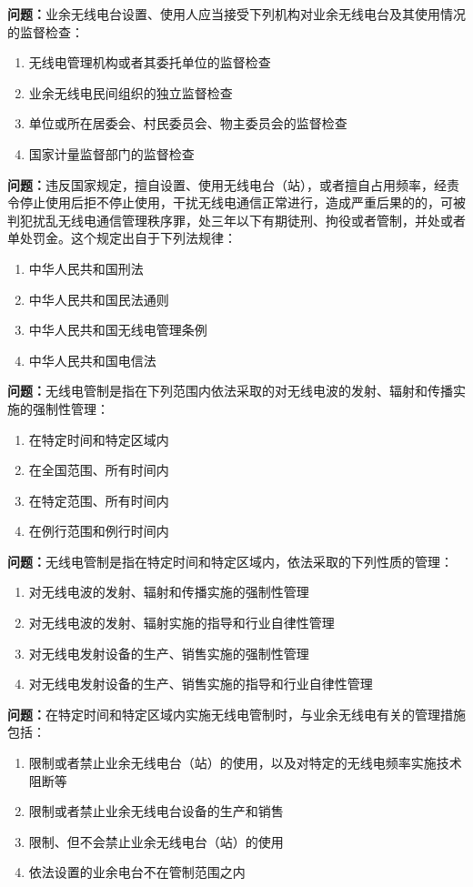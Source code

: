 \textbf{问题：}业余无线电台设置、使用人应当接受下列机构对业余无线电台及其使用情况的监督检查：
\begin{enumerate}[label=\Alph*), leftmargin=1cm]
	\item 无线电管理机构或者其委托单位的监督检查
	\item 业余无线电民间组织的独立监督检查
	\item 单位或所在居委会、村民委员会、物主委员会的监督检查
	\item 国家计量监督部门的监督检查
\end{enumerate}

\textbf{问题：}违反国家规定，擅自设置、使用无线电台（站），或者擅自占用频率，经责令停止使用后拒不停止使用，干扰无线电通信正常进行，造成严重后果的的，可被判犯扰乱无线电通信管理秩序罪，处三年以下有期徒刑、拘役或者管制，并处或者单处罚金。这个规定出自于下列法规律：
\begin{enumerate}[label=\Alph*), leftmargin=1cm]
	\item 中华人民共和国刑法
	\item 中华人民共和国民法通则
	\item 中华人民共和国无线电管理条例
	\item 中华人民共和国电信法
\end{enumerate}

\textbf{问题：}无线电管制是指在下列范围内依法采取的对无线电波的发射、辐射和传播实施的强制性管理：
\begin{enumerate}[label=\Alph*), leftmargin=1cm]
	\item 在特定时间和特定区域内
	\item 在全国范围、所有时间内
	\item 在特定范围、所有时间内
	\item 在例行范围和例行时间内
\end{enumerate}

\textbf{问题：}无线电管制是指在特定时间和特定区域内，依法采取的下列性质的管理：
\begin{enumerate}[label=\Alph*), leftmargin=1cm]
	\item 对无线电波的发射、辐射和传播实施的强制性管理
	\item 对无线电波的发射、辐射实施的指导和行业自律性管理
	\item 对无线电发射设备的生产、销售实施的强制性管理
	\item 对无线电发射设备的生产、销售实施的指导和行业自律性管理
\end{enumerate}

\textbf{问题：}在特定时间和特定区域内实施无线电管制时，与业余无线电有关的管理措施包括：
\begin{enumerate}[label=\Alph*), leftmargin=1cm]
	\item 限制或者禁止业余无线电台（站）的使用，以及对特定的无线电频率实施技术阻断等
	\item 限制或者禁止业余无线电台设备的生产和销售
	\item 限制、但不会禁止业余无线电台（站）的使用
	\item 依法设置的业余电台不在管制范围之内
\end{enumerate}

